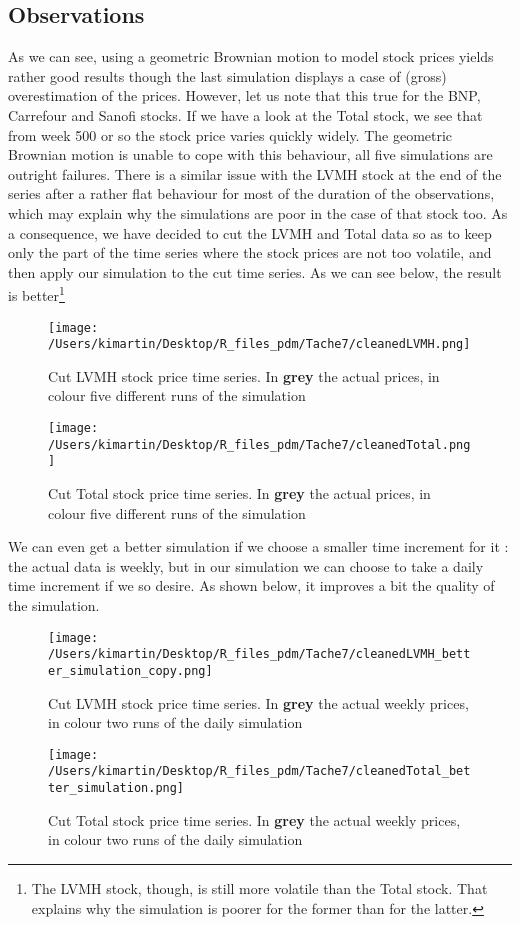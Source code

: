 \subsection{Observations}
As we can see, using a geometric Brownian motion to model stock prices yields rather good results though the last simulation displays a case of (gross) overestimation of the prices. However, let us note that this true for the BNP, Carrefour and Sanofi stocks. If we have a look at the Total stock, we see that from week 500 or so the stock price varies quickly widely. The geometric Brownian motion is unable to cope with this behaviour, all five simulations are outright failures. There is a similar issue with the LVMH stock at the end of the series after a rather flat behaviour for most of the duration of the observations, which may explain why the simulations are poor in the case of that stock too. \newline
As a consequence, we have decided to cut the LVMH and Total data so as to keep only the part of the time series where the stock prices are not too volatile, and then apply our simulation to the cut time series. As we can see below, the result is better\footnote{The LVMH stock, though, is still more volatile than the Total stock. That explains why the simulation is poorer for the former than for the latter.}
\begin{figure}[h!]
	\centering
	\texttt{[image: /Users/kimartin/Desktop/R\_files\_pdm/Tache7/cleanedLVMH.png]}
	\caption{Cut LVMH stock price time series. In \textbf{grey} the actual prices, in colour five different runs of the simulation}
	\label{fig:cutLVMH}
\end{figure}
\begin{figure}[h!]
	\centering
	\texttt{[image: /Users/kimartin/Desktop/R\_files\_pdm/Tache7/cleanedTotal.png]}
	\caption{Cut Total stock price time series. In \textbf{grey} the actual prices, in colour five different runs of the simulation}
	\label{fig:cutTotal}
\end{figure}
\clearpage
We can even get a better simulation if we choose a smaller time increment for it : the actual data is weekly, but in our simulation we can choose to take a daily time increment if we so desire. As shown below, it improves a bit the quality of the simulation.
\begin{figure}[h!]
	\centering
	\texttt{[image: /Users/kimartin/Desktop/R\_files\_pdm/Tache7/cleanedLVMH\_better\_simulation\_copy.png]}
	\caption{Cut LVMH stock price time series. In \textbf{grey} the actual weekly prices, in colour two runs of the daily simulation}
	\label{fig:cutLVMHbetter}
\end{figure}
\begin{figure}[h!]
	\centering
	\texttt{[image: /Users/kimartin/Desktop/R\_files\_pdm/Tache7/cleanedTotal\_better\_simulation.png]}
	\caption{Cut Total stock price time series. In \textbf{grey} the actual weekly prices, in colour two runs of the daily simulation}
	\label{fig:cutTotalbetter}
\end{figure}
\clearpage
